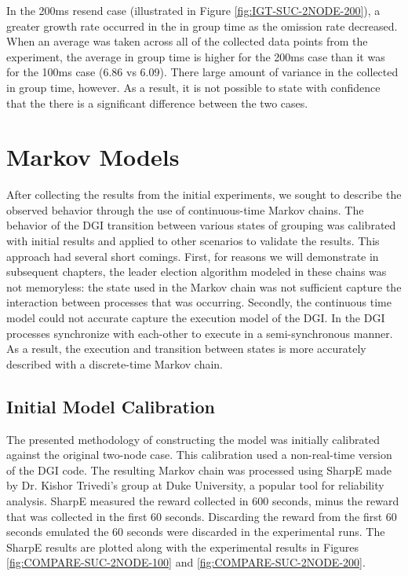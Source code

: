 In the 200ms resend case (illustrated in Figure \ref{fig:IGT-SUC-2NODE-200}), a greater growth rate occurred in the in group time as the omission rate decreased.
When an average was taken across all of the collected data points from the experiment, the average in group time is higher for the 200ms case than it was for the 100ms case (6.86 vs 6.09).
There large amount of variance in the collected in group time, however.
As a result, it is not possible to state with confidence that the there is a significant difference between the two cases.


\section{Markov Models}

After collecting the results from the initial experiments, we sought to describe the observed behavior through the use of continuous-time Markov chains.
The behavior of the DGI transition between various states of grouping was calibrated with initial results and applied to other scenarios to validate the results.
This approach had several short comings.
First, for reasons we will demonstrate in subsequent chapters, the leader election algorithm modeled in these chains was not memoryless: the state used in the Markov chain was not sufficient capture the interaction between processes that was occurring.
Secondly, the continuous time model could not accurate capture the execution model of the DGI.
In the DGI processes synchronize with each-other to execute in a semi-synchronous manner.
As a result, the execution and transition between states is more accurately described with a discrete-time Markov chain.

\subsection{Initial Model Calibration}

The presented methodology of constructing the model was initially calibrated against the original two-node case.
This calibration used a non-real-time version of the DGI code.
The resulting Markov chain was processed using SharpE \cite{SHARPE}\cite{SHARPE2} made by Dr. Kishor Trivedi's group at Duke University, a popular tool for reliability analysis.
SharpE measured the reward collected in 600 seconds, minus the reward that was collected in the first 60 seconds. 
Discarding the reward from the first 60 seconds emulated the 60 seconds were discarded in the experimental runs.
The SharpE results are plotted along with the experimental results in Figures \ref{fig:COMPARE-SUC-2NODE-100} and \ref{fig:COMPARE-SUC-2NODE-200}.

